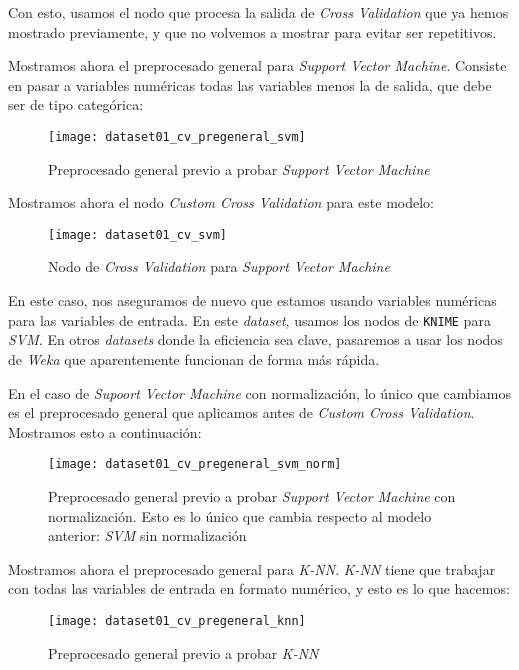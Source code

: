 \documentclass[11pt]{article}
\begin{document}
Con esto, usamos el nodo que procesa la salida de \emph{Cross Validation} que ya hemos mostrado previamente, y que no volvemos a mostrar para evitar ser repetitivos.

Mostramos ahora el preprocesado general para \emph{Support Vector Machine}. Consiste en pasar a variables numéricas todas las variables menos la de salida, que debe ser de tipo categórica:

\begin{figure}[H]
    \centering
    \texttt{[image: dataset01\_cv\_pregeneral\_svm]}
    \caption{Preprocesado general previo a probar \emph{Support Vector Machine}}
\end{figure}

Mostramos ahora el nodo \emph{Custom Cross Validation} para este modelo:

\begin{figure}[H]
    \centering
    \texttt{[image: dataset01\_cv\_svm]}
    \caption{Nodo de \emph{Cross Validation} para \emph{Support Vector Machine}}
\end{figure}

En este caso, nos aseguramos de nuevo que estamos usando variables numéricas para las variables de entrada. En este \emph{dataset}, usamos los nodos de \lstinline{KNIME} para \emph{SVM}. En otros \emph{datasets} donde la eficiencia sea clave, pasaremos a usar los nodos de \emph{Weka} que aparentemente funcionan de forma más rápida.

En el caso de \emph{Supoort Vector Machine} con normalización, lo único que cambiamos es el preprocesado general que aplicamos antes de \emph{Custom Cross Validation}. Mostramos esto a continuación:

\begin{figure}[H]
    \centering
    \texttt{[image: dataset01\_cv\_pregeneral\_svm\_norm]}
    \caption{Preprocesado general previo a probar \emph{Support Vector Machine} con normalización. Esto es lo único que cambia respecto al modelo anterior: \emph{SVM} sin normalización}
\end{figure}

Mostramos ahora el preprocesado general para \emph{K-NN}. \emph{K-NN} tiene que trabajar con todas las variables de entrada en formato numérico, y esto es lo que hacemos:

\begin{figure}[H]
    \centering
    \texttt{[image: dataset01\_cv\_pregeneral\_knn]}
    \caption{Preprocesado general previo a probar \emph{K-NN}}
\end{figure}
\end{document}
